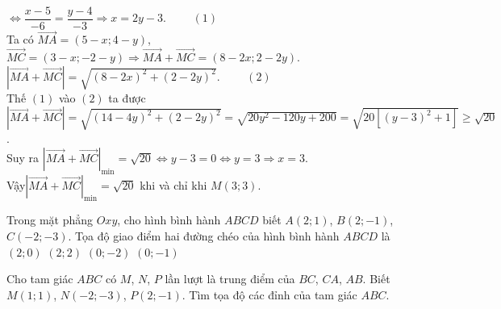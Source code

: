 \begin{bt}
{\begin{enumerate}
			$ \Leftrightarrow\dfrac{x-5}{-6}=\dfrac{y-4}{-3}\Rightarrow x=2y-3$. $\qquad(1)$\\
		 Ta có $\overrightarrow{MA}=(5-x;4-y)$, $\overrightarrow{MC}=(3-x;-2-y) \Rightarrow\overrightarrow{MA}+\overrightarrow{MC}=(8-2x;2-2y)$.\\
		 $ \left|\overrightarrow{MA}+\overrightarrow{MC}\right|=\sqrt{(8-2x)^2+(2-2y)^2}$. $\qquad(2)$\\
		Thế $(1)$ vào $(2)$ ta được\\
		$\left|\overrightarrow{MA}+\overrightarrow{MC}\right|=\sqrt{(14 -4y)^2+(2-2y)^2}=\sqrt{ 20y^2- 120y+ 200}=\sqrt{20 \left[(y-3)^2+1\right]}\ge\sqrt{20}$.\\
		Suy ra $\left|\overrightarrow{MA}+\overrightarrow{MC}\right|_{\min}=\sqrt{20}\Leftrightarrow y- 3=0 \Leftrightarrow y=3\Rightarrow x=3$.\\
		Vậy$ \left|\overrightarrow{MA}+\overrightarrow{MC}\right|_{\min}=\sqrt{20} $ khi và chỉ khi  $M (3;3) $.\\
		\end{enumerate}	
		}
\end{bt}

\begin{ex}%
	Trong mặt phẳng $Oxy$, cho hình bình hành $ABCD$ biết $A(2; 1)$, $B(2;-1)$, $C(-2;-3)$. Tọa độ giao điểm hai đường chéo của hình bình hành  $ABCD$ là
	\choice 
		 {$(2; 0)$}
		 {$(2; 2)$}
		{$(0;-2)$} 
		{\True $(0;-1)$} 
\end{ex}

\begin{bt}%
	Cho tam giác $ABC$ có $M$, $N$, $P$ lần lượt là trung điểm của $BC$, $CA$, $AB$. Biết $M(1;1)$, $N(-2;-3)$, $P(2;-1)$. Tìm tọa độ các đỉnh của tam giác $ABC$.
\end{bt}


